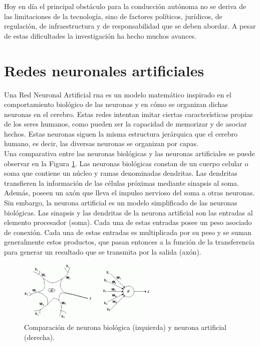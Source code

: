 Hoy en día el principal obstáculo para la conducción autónoma no se deriva de las limitaciones de la tecnología, sino de factores políticos, jurídicos, de regulación, de infraestructura y de responsabilidad que se deben abordar. A pesar de estas dificultades la investigación ha hecho muchos avances.\\


\section{Redes neuronales artificiales}

Una Red Neuronal Artificial \acrshort{rna} es un modelo matemático inspirado en el comportamiento biológico de las neuronas y en cómo se organizan dichas neuronas en el cerebro. Estas redes intentan imitar ciertas  características propias de los seres humanos, como pueden ser la capacidad de memorizar y de asociar hechos. Estas neuronas siguen la misma estructura jerárquica que el cerebro humano, es decir, las diversas neuronas se organizan por capas.\\

Una comparativa entre las neuronas biológicas y las neuronas artificiales se puede observar en la Figura \ref{fig.neurona}. Las neuronas biológicas constan de un cuerpo celular o soma que contiene un núcleo y ramas denominadas dendritas. Las dendritas transfieren la información de las células próximas mediante sinapsis al soma. Además, poseen un axón que lleva el impulso nervioso del soma a otras neuronas. Sin embargo, la neurona artificial es un modelo simplificado de las neuronas biológicas. Las sinapsis y las dendritas de  la  neurona  artificial  son las  entradas  al  elemento procesador (soma). Cada una de estas entradas posee un peso asociado de conexión. Cada una de estas entradas es multiplicada por su peso y se suman generalmente estos productos, que pasan entonces a la función de la transferencia para generar un resultado que se transmita por la salida (axón).\\

\begin{figure}[H]
  \begin{center}
    \includegraphics[width=0.6\textwidth]{figures/Introduccion/neurona.png}
		\caption{Comparación de neurona biológica (izquierda) y neurona artificial (derecha).}
		\label{fig.neurona}
		\end{center}
\end{figure}

